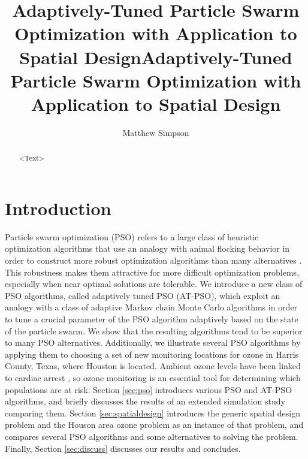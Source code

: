 \documentclass[cmbright]{staauth}
\begin{document}
\blind
{
  \title{Adaptively-Tuned Particle Swarm Optimization with Application to Spatial Design}
  \author{Matthew Simpson}
  \address{Department of Statistics, University of Missouri,\\
    146 Middlebush Hall, Columbia, MO 65211-6100}
}\fi
{}\blind
{
  \title{Adaptively-Tuned Particle Swarm Optimization with Application to Spatial Design}
  \author{}
  \address{}
  \corremail{}
  \received{}
  \accepted{}
}\fi
\begin{abstract}
<Text>
\end{abstract}
\maketitle

\section{Introduction}
Particle swarm optimization (PSO) refers to a large class of heuristic optimization algorithms that use an analogy with animal flocking behavior in order to construct more robust optimization algorithms than many alternatives \citep{clerc2002particle,blum2008swarm,clerc2010particle}. This robustness makes them attractive for more difficult optimization problems, especially when near optimal solutions are tolerable. We introduce a new class of PSO algorithms, called adaptively tuned PSO (AT-PSO), which exploit an analogy with a class of adaptive Markov chain Monte Carlo algorithms in order to tune a crucial parameter of the PSO algorithm adaptively based on the state of the particle swarm. We show that the resulting algorithms tend to be superior to many PSO alternatives. Additionally, we illustrate several PSO algorithms by applying them to choosing a set of new monitoring locations for ozone in Harris County, Texas, where Houston is located. Ambient ozone levels have been linked to cardiac arrest \citep{ensor2013case}, so ozone monitoring is an essential tool for determining which populations are at risk. Section \ref{sec:pso} introduces various PSO and AT-PSO algorithms, and briefly discusses the results of an extended simulation study comparing them. Section \ref{sec:spatialdesign} introduces the generic spatial design problem and the Houson area ozone problem as an instance of that problem, and compares several PSO algorithms and some alternatives to solving the problem. Finally, Section \ref{sec:discuss} discusses our results and concludes.
\end{document}
